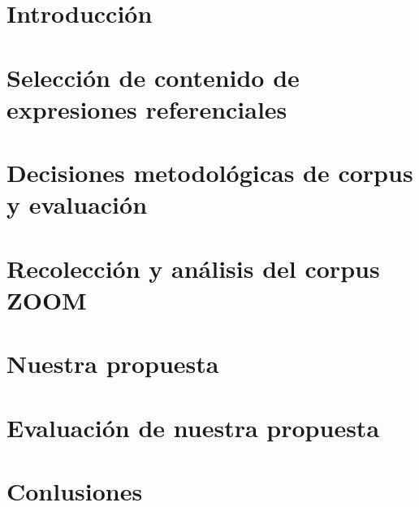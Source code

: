 %

\mainmatter %



\chapter{Introducci\'on}
\label{ch:intro}

\chapter{Selecci\'on de contenido de expresiones referenciales}
\label{ch:seleccion}


\chapter{Decisiones metodol\'ogicas de corpus y evaluaci\'on}
\label{ch:metodologia}


\chapter{Recolecci\'on y an\'alisis del corpus ZOOM}
\label{ch:aplicacion}


\chapter{Nuestra propuesta}
\label{ch:algoritmo}


\chapter{Evaluaci\'on de nuestra propuesta}
\label{ch:corpus}


\chapter{ Conlusiones}
\label{ch:conlusiones}

\vskip 0.2in



